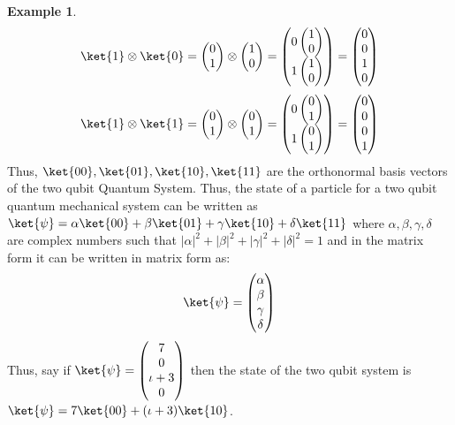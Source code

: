 \documentclass[12pt, oneside]{book}
\theoremstyle{definition}
\theoremstyle{definition}
\newtheorem{example}{Example}[section]
\theoremstyle{remark}
\begin{document}
\begin{example}
    \[ \ket{1} \otimes \ket{0} = \begin{pmatrix} 0 \\ 1 \end{pmatrix} \otimes \begin{pmatrix} 1 \\ 0 \end{pmatrix} = \begin{pmatrix} 0 \begin{pmatrix} 1 \\ 0 \end{pmatrix} \\ 1 \begin{pmatrix} 1 \\ 0 \end{pmatrix} \end{pmatrix} = \begin{pmatrix} 0 \\ 0 \\ 1 \\ 0 \end{pmatrix} \]
    \[ \ket{1} \otimes \ket{1} = \begin{pmatrix} 0 \\ 1 \end{pmatrix} \otimes \begin{pmatrix} 0 \\ 1 \end{pmatrix} = \begin{pmatrix} 0 \begin{pmatrix} 0 \\ 1 \end{pmatrix} \\ 1 \begin{pmatrix} 0 \\ 1 \end{pmatrix} \end{pmatrix} = \begin{pmatrix} 0 \\ 0 \\ 0 \\ 1 \end{pmatrix} \]
Thus, $\ket{00},\ket{01},\ket{10},\ket{11}$ are the orthonormal basis vectors of the two qubit Quantum System. Thus, the state of a particle for a two qubit quantum mechanical system can be written as 
$\ket{\psi}=\alpha\ket{00}+\beta\ket{01}+\gamma\ket{10}+\delta\ket{11}$ where $\alpha,\beta,\gamma,\delta$ are complex numbers such that $|\alpha|^2+|\beta|^2+|\gamma|^2+|\delta|^2=1$ and in the matrix form it can be written in matrix form as:
\[
    \ket{\psi}=\begin{pmatrix} \alpha \\ \beta \\ \gamma \\ \delta \end{pmatrix}
\]
Thus, say if $\ket{\psi}=\begin{pmatrix} 7 \\ 0 \\ \iota +3 \\ 0 \end{pmatrix}$ then the state of the two qubit system is $\ket{\psi}=7\ket{00}+(\iota+3)\ket{10}$.
\end{example}
\end{document}
